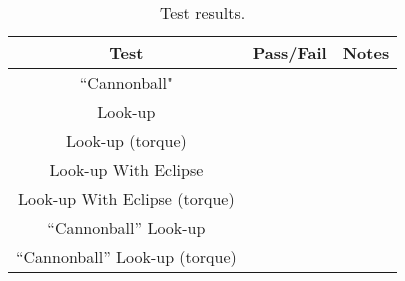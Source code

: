 \begin{table}[H]
	\caption{Test results.}
	\label{tab:results}
	\centering \fontsize{10}{10}\selectfont
	\begin{tabular}{c | c | c  } %
		\hline
		\textbf{Test} 				      			& \textbf{Pass/Fail} 						   		   		 				& \textbf{Notes} 									        \\ \hline
		``Cannonball"	   			  			&      	  					& 	        \\ \hline
		Look-up	   	                     				&              				  &            		\\ \hline
		Look-up	(torque)			               & 				  			     &					\\ \hline   	
		Look-up With Eclipse      				&  			&\\ \hline		
		Look-up With Eclipse (torque)	&                 &\\ \hline
		``Cannonball'' Look-up				&				&\\ \hline
		``Cannonball'' Look-up (torque)&               &\\ \hline
	\end{tabular}
\end{table}